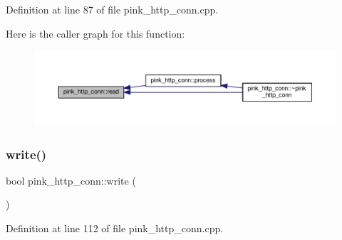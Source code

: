 Definition at line 87 of file pink\+\_\+http\+\_\+conn.\+cpp.

Here is the caller graph for this function\+:
\nopagebreak
\begin{figure}[H]
\begin{center}
\leavevmode
\includegraphics[width=350pt]{classpink__http__conn_a254c09e8b962e5a0bc116f8da271b5ed_icgraph}
\end{center}
\end{figure}
\mbox{\label{classpink__http__conn_a362df085394bbf2818c8af93932c80d5}} 
\subsubsection{\texorpdfstring{write()}{write()}}
{\footnotesize\ttfamily bool pink\+\_\+http\+\_\+conn\+::write (\begin{DoxyParamCaption}{ }\end{DoxyParamCaption})}



Definition at line 112 of file pink\+\_\+http\+\_\+conn.\+cpp.

